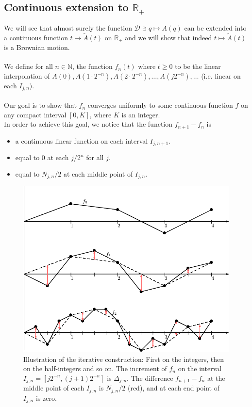 \documentclass[../mainfile.tex]{subfiles}
\begin{document}
\subsection{Continuous extension to $\mathbb{R}_+$
}
We will see that almost surely the function $\mathcal{D} \ni q \mapsto A(q)$ can be extended into a continuous function $t \mapsto \tilde{A}(t)$ on $\mathbb{R}_+$ and we will show that indeed $t \mapsto \tilde{A}(t)$ is a Brownian motion. \\
\\
We define for all $n \in \mathbb{N}$, the function $f_n(t)$ where $t \geq 0$ to be the linear interpolation of $A(0), A(1\cdot 2^{-n}), A(2\cdot 2^{-n}), \dots ,  A(j2^{-n}) , \dots$ (i.e. linear on each $I_{j,n})$. 
\\\\
Our goal is to show that $f_n$ converges uniformly to some continuous function $f$ on any compact interval $[0,K]$, where $K$ is an integer. 
\\
In order to achieve this goal, we notice that the function $f_{n+1}-f_n$ is
\begin{itemize}
\item a continuous linear function on each interval $I_{j,n+1}$.
\item equal to $0$ at each $j/2^n$ for all $j$. 
\item equal to $N_{j,n}/2$ at each middle point of $I_{j,n}$. 
\end{itemize}
\begin{figure}[hbtp]
\centering
\includegraphics[scale=.742]{figurewend.pdf}
\caption{Illustration of the iterative construction: First on the integers, then on the half-integers and so on. The increment of $f_n$ on the interval $I_{j,n}=[j2^{-n},(j+1)2^{-n}]$ is $\Delta_{j,n}$. The difference $f_{n+1}-f_n$ at the middle point of each $I_{j,n}$ is $N_{j,n}/2$ (red), and at each end point of $I_{j,n}$ is zero.}
\end{figure}
\end{document}
